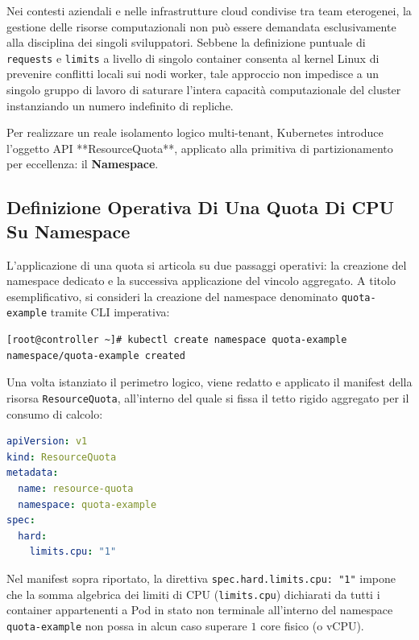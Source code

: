 \documentclass[11pt, a4paper]{article}
\begin{document}
Nei contesti aziendali e nelle infrastrutture cloud condivise tra team eterogenei, la gestione delle risorse computazionali non può essere demandata esclusivamente alla disciplina dei singoli sviluppatori. Sebbene la definizione puntuale di \texttt{requests} e \texttt{limits} a livello di singolo container consenta al kernel Linux di prevenire conflitti locali sui nodi worker, tale approccio non impedisce a un singolo gruppo di lavoro di saturare l'intera capacità computazionale del cluster instanziando un numero indefinito di repliche.

Per realizzare un reale isolamento logico multi-tenant, Kubernetes introduce l'oggetto API **ResourceQuota**, applicato alla primitiva di partizionamento per eccellenza: il \textbf{Namespace}.

\subsection{Definizione Operativa Di Una Quota Di CPU Su Namespace}

L'applicazione di una quota si articola su due passaggi operativi: la creazione del namespace dedicato e la successiva applicazione del vincolo aggregato. A titolo esemplificativo, si consideri la creazione del namespace denominato \texttt{quota-example} tramite CLI imperativa:

\begin{lstlisting}[language=bash]
[root@controller ~]# kubectl create namespace quota-example
namespace/quota-example created
\end{lstlisting}

Una volta istanziato il perimetro logico, viene redatto e applicato il manifest della risorsa \texttt{ResourceQuota}, all'interno del quale si fissa il tetto rigido aggregato per il consumo di calcolo:

\begin{lstlisting}[language=yaml]
apiVersion: v1
kind: ResourceQuota
metadata:
  name: resource-quota
  namespace: quota-example
spec:
  hard:
    limits.cpu: "1"
\end{lstlisting}

Nel manifest sopra riportato, la direttiva \texttt{spec.hard.limits.cpu: "1"} impone che la somma algebrica dei limiti di CPU (\texttt{limits.cpu}) dichiarati da tutti i container appartenenti a Pod in stato non terminale all'interno del namespace \texttt{quota-example} non possa in alcun caso superare $1$ core fisico (o vCPU).
\end{document}
